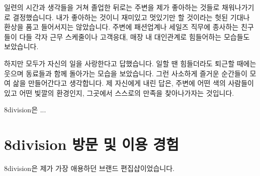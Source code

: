 일련의 시간과 생각들을 거쳐 졸업한 뒤로는 주변을 제가 좋아하는 것들로 채워나가기로 결정했습니다. 내가 좋아하는 것이니 재미있고 멋있기만 할 것이라는 헛된 기대나 환상을 품고 들어서지는 않았습니다. 주변에 패션업계나 세일즈 직무에 종사하는 친구들이 다들 각자 근무 스케줄이나 고객응대, 매장 내 대인관계로 힘들어하는 모습들도 보았습니다.

하지만 모두가 자신의 일을 사랑한다고 답했습니다. 일할 땐 힘들더라도 퇴근할 때에는 웃으며 동료들과 함께 돌아가는 모습을 보았습니다. 그런 사소하게 즐거운 순간들이 모여 삶을 만들어간다고 생각합니다. 제 자신에게 내린 답은, 주변에 어떤 색의 사람들이 있고 어떤 빛깔의 환경인지, 그곳에서 스스로의 만족을 찾아나가자는 것입니다.

8division은 ...

\section*{8division 방문 및 이용 경험}
8division은 제가 가장 애용하던 브랜드 편집샵이었습니다. 




